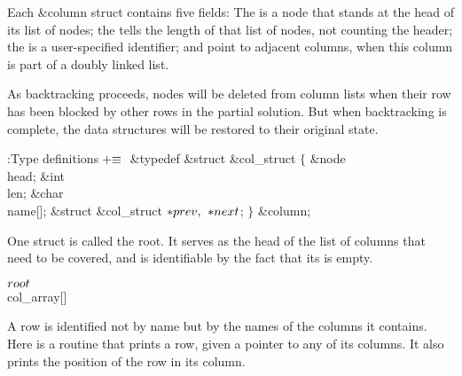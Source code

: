 Each \&{column} struct contains five fields:
The  is a node that stands at the head of its list of nodes;
the  tells the length of that list of nodes, not counting the
header;
the  is a user-specified identifier;
 and  point to adjacent columns, when this
column is part of a doubly linked list.

As backtracking proceeds, nodes
will be deleted from column lists when their row has been blocked by
other rows in the partial solution.
But when backtracking is complete, the data structures will be
restored to their original state.

\Y\B\4:Type definitions\X${}\mathrel+\equiv{}$\6
\&{typedef} \&{struct} \&{col\_struct} ${}\{{}$\1\6
\&{node} \\{head};\6
\&{int} \\{len};\6
\&{char} \\{name}[];\6
\&{struct} \&{col\_struct} ${}{*}\\{prev},{}$ ${}{*}\\{next}{}$;\2\6
${}\}{}$ \&{column};\par
\fi

One  struct is called the root. It serves as the head of
the
list of columns that need to be covered, and is identifiable by the fact
that its  is empty.

\Y\B\4\D$\\{root}$ \5
\\{col\_array}[]\par
\fi

A row is identified not by name but by the names of the columns it
contains.
Here is a routine that prints a row, given a pointer to any of its
columns. It also prints the position of the row in its column.


